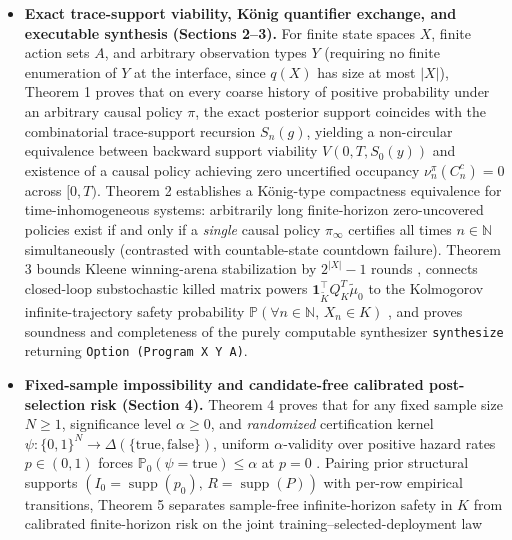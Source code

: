 \documentclass[11pt,a4paper]{article}
\providecommand{\tightlist}{\setlength{\itemsep}{2pt}\setlength{\parskip}{0pt}}
\begin{document}
\begin{itemize}
\tightlist
\item
  \textbf{Exact trace-support viability, König quantifier exchange, and
  executable synthesis (Sections 2--3).} For finite state spaces \(X\),
  finite action sets \(A\), and arbitrary observation types \(Y\)
  (requiring no finite enumeration of \(Y\) at the interface, since
  \(q(X)\) has size at most \(|X|\)), Theorem 1 proves that on every
  coarse history of positive probability under an arbitrary causal
  policy \(\pi\), the exact posterior support coincides with the
  combinatorial trace-support recursion \(S_n(g)\), yielding a
  non-circular equivalence between backward support viability
  \(V(0, T, S_0(y))\) and existence of a causal policy achieving zero
  uncertified occupancy \(\nu_n^\pi(C_n^c) = 0\) across \([0,T)\).
  Theorem 2 establishes a König-type compactness equivalence
  \citep{konig1927} for time-inhomogeneous systems: arbitrarily long
  finite-horizon zero-uncovered policies exist if and only if a
  \emph{single} causal policy \(\pi_\infty\) certifies all times
  \(n \in \mathbb{N}\) simultaneously (contrasted with countable-state
  countdown failure). Theorem 3 bounds Kleene winning-arena
  stabilization by \(2^{|X|} - 1\) rounds
  \citep{tarski1955, aubinCellina1984, aubin1991}, connects closed-loop
  substochastic killed matrix powers
  \(\mathbf{1}_{\widetilde{K}}^\top Q_K^T \widetilde{\mu}_0\)
  \citep{darrochSeneta1965, seneta1981, collet2013} to the Kolmogorov
  infinite-trajectory safety probability
  \(\mathbb{P}(\forall n \in \mathbb{N},\, X_n \in K)\)
  \citep{kallenberg2021}, and proves soundness and completeness of the
  purely computable synthesizer \texttt{synthesize} returning
  \texttt{Option\ (Program\ X\ Y\ A)}.
\item
  \textbf{Fixed-sample impossibility and candidate-free calibrated
  post-selection risk (Section 4).} Theorem 4 proves that for any fixed
  sample size \(N \ge 1\), significance level \(\alpha \ge 0\), and
  \emph{randomized} certification kernel
  \(\psi : \{0,1\}^N \to \Delta(\{\mathrm{true}, \mathrm{false}\})\),
  uniform \(\alpha\)-validity over positive hazard rates \(p \in (0,1)\)
  forces \(\mathbb{P}_0(\psi = \mathrm{true}) \le \alpha\) at \(p = 0\)
  \citep{leCam1973, tsybakov2009}. Pairing prior structural supports
  \((I_0 = \operatorname{supp}(p_0),\, R = \operatorname{supp}(P))\)
  with per-row empirical transitions, Theorem 5 separates sample-free
  infinite-horizon safety in \(K\) from calibrated finite-horizon risk
  on the joint training--selected-deployment law

\end{itemize}
\end{document}
